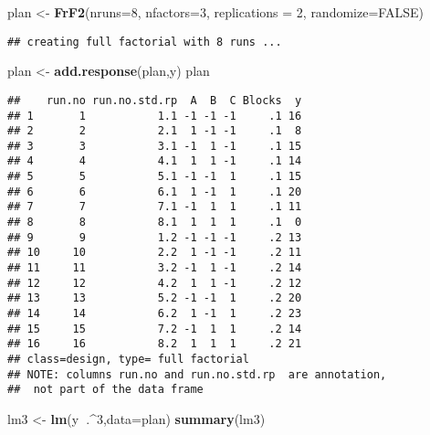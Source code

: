 \documentclass[]{article}
\newenvironment{Shaded}{\begin{snugshade}}{\end{snugshade}}
\newcommand{\KeywordTok}[1]{\textcolor[rgb]{0.13,0.29,0.53}{\textbf{#1}}}
\newcommand{\DataTypeTok}[1]{\textcolor[rgb]{0.13,0.29,0.53}{#1}}
\newcommand{\DecValTok}[1]{\textcolor[rgb]{0.00,0.00,0.81}{#1}}
\newcommand{\StringTok}[1]{\textcolor[rgb]{0.31,0.60,0.02}{#1}}
\newcommand{\OtherTok}[1]{\textcolor[rgb]{0.56,0.35,0.01}{#1}}
\newcommand{\OperatorTok}[1]{\textcolor[rgb]{0.81,0.36,0.00}{\textbf{#1}}}
\newcommand{\NormalTok}[1]{#1}
\begin{document}
\begin{Shaded}
\begin{Highlighting}[]
\NormalTok{plan <-}\StringTok{ }\KeywordTok{FrF2}\NormalTok{(}\DataTypeTok{nruns=}\DecValTok{8}\NormalTok{, }\DataTypeTok{nfactors=}\DecValTok{3}\NormalTok{, }\DataTypeTok{replications =} \DecValTok{2}\NormalTok{, }\DataTypeTok{randomize=}\OtherTok{FALSE}\NormalTok{)}
\end{Highlighting}
\end{Shaded}

\begin{verbatim}
## creating full factorial with 8 runs ...
\end{verbatim}

\begin{Shaded}
\begin{Highlighting}[]
\NormalTok{plan <-}\StringTok{ }\KeywordTok{add.response}\NormalTok{(plan,y)}
\NormalTok{plan}
\end{Highlighting}
\end{Shaded}

\begin{verbatim}
##    run.no run.no.std.rp  A  B  C Blocks  y
## 1       1           1.1 -1 -1 -1     .1 16
## 2       2           2.1  1 -1 -1     .1  8
## 3       3           3.1 -1  1 -1     .1 15
## 4       4           4.1  1  1 -1     .1 14
## 5       5           5.1 -1 -1  1     .1 15
## 6       6           6.1  1 -1  1     .1 20
## 7       7           7.1 -1  1  1     .1 11
## 8       8           8.1  1  1  1     .1  0
## 9       9           1.2 -1 -1 -1     .2 13
## 10     10           2.2  1 -1 -1     .2 11
## 11     11           3.2 -1  1 -1     .2 14
## 12     12           4.2  1  1 -1     .2 12
## 13     13           5.2 -1 -1  1     .2 20
## 14     14           6.2  1 -1  1     .2 23
## 15     15           7.2 -1  1  1     .2 14
## 16     16           8.2  1  1  1     .2 21
## class=design, type= full factorial 
## NOTE: columns run.no and run.no.std.rp  are annotation, 
##  not part of the data frame
\end{verbatim}

\begin{Shaded}
\begin{Highlighting}[]
\NormalTok{lm3 <-}\StringTok{ }\KeywordTok{lm}\NormalTok{(y}\OperatorTok{~}\NormalTok{.}\OperatorTok{^}\DecValTok{3}\NormalTok{,}\DataTypeTok{data=}\NormalTok{plan)}
\KeywordTok{summary}\NormalTok{(lm3)}
\end{Highlighting}
\end{Shaded}
\end{document}
